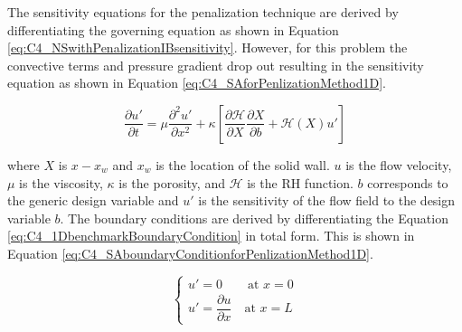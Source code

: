 The sensitivity equations for the penalization technique are derived by differentiating the governing equation as shown in Equation \eqref{eq:C4_NSwithPenalizationIBsensitivity}. However, for this problem the convective terms and pressure gradient drop out resulting in the sensitivity equation as shown in Equation \eqref{eq:C4_SAforPenlizationMethod1D}.

\begin{equation}\label{eq:C4_SAforPenlizationMethod1D}
	\frac{\partial u'}{\partial t} = 
	\mu \frac{\partial^2 u'}{\partial x^2} +
	\kappa \left[
	\frac{\partial \mathcal{H}}{\partial X} \frac{\partial X}{\partial b} + 
	\mathcal{H}(X) u'
	\right]
\end{equation}

where $X$ is $x - x_w$ and $x_w$ is the location of the solid wall. $u$ is the flow velocity, $\mu$ is the viscosity, $\kappa$ is the porosity, and $\mathcal{H}$ is the RH function. $b$ corresponds to the generic design variable and $u'$ is the sensitivity of the flow field to the design variable $b$. The boundary conditions are derived by differentiating the Equation \eqref{eq:C4_1DbenchmarkBoundaryCondition} in total form. This is shown in Equation \eqref{eq:C4_SAboundaryConditionforPenlizationMethod1D}.

\begin{equation}\label{eq:C4_SAboundaryConditionforPenlizationMethod1D}
\begin{cases}
	u' = 0 \qquad \text{at } x = 0 \\
	u' = \dfrac{\partial u}{\partial x} \quad \text{at } x = L
\end{cases}
\end{equation}
